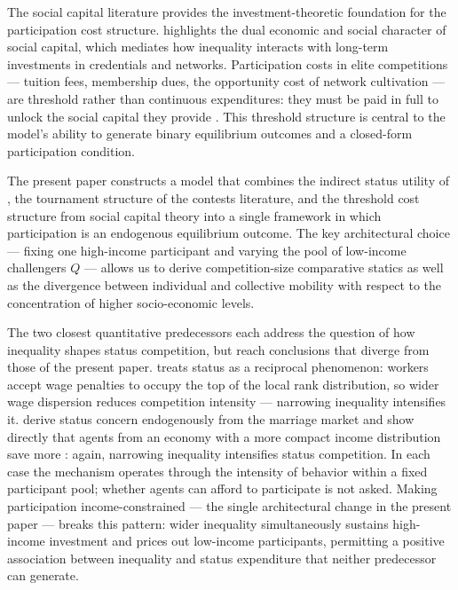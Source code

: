 \documentclass[
    oneside,
    fontsize=10pt,leqno]{article}
\begin{document}
The social capital literature provides the investment-theoretic
foundation for the participation cost structure. \citet{Jencks1979}
highlights the dual economic and social character of social capital,
which mediates how inequality interacts with long-term investments
in credentials and networks. Participation costs in elite competitions
--- tuition fees, membership dues, the opportunity cost of network
cultivation --- are threshold rather than continuous expenditures:
they must be paid in full to unlock the social capital they provide
\citep{HeckmanMosso2014}. This threshold structure is central to
the model's ability to generate binary equilibrium outcomes and a
closed-form participation condition.

The present paper constructs a model that combines the indirect
status utility of \citet{postlewaite1998socialbasisinterdeppreferences},
the tournament structure of the contests literature, and the threshold
cost structure from social capital theory into a single framework in
which participation is an endogenous equilibrium outcome. The key architectural choice --- fixing one high-income participant and varying the
pool of low-income challengers $Q$ --- allows us to derive competition-size comparative statics as well as the divergence between individual and collective mobility with respect to the concentration of higher socio-economic levels.


The two closest quantitative predecessors each address the question
of how inequality shapes status competition, but reach conclusions
that diverge from those of the present paper. \citet{FrankAER1984}
treats status as a reciprocal phenomenon: workers accept wage
penalties to occupy the top of the local rank distribution, so
wider wage dispersion reduces competition intensity --- narrowing
inequality intensifies it. \citet{ColeMailaithPostlewaite1992}
derive status concern endogenously from the marriage market and show
directly that agents from an economy with a more compact income
distribution save more \citep[p.~1103]{ColeMailaithPostlewaite1992}:
again, narrowing inequality intensifies status competition. In each
case the mechanism operates through the intensity of behavior within
a fixed participant pool; whether agents can afford to participate is
not asked. Making participation income-constrained --- the single
architectural change in the present paper --- breaks this pattern:
wider inequality simultaneously sustains high-income investment and
prices out low-income participants, permitting a positive association
between inequality and status expenditure that neither predecessor
can generate.
\end{document}
